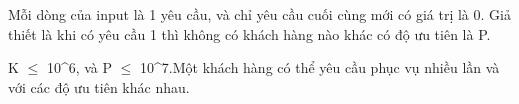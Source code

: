 Mỗi dòng của input là 1 yêu cầu, và chỉ yêu cầu cuối cùng mới có giá trị là 0. Giả thiết là khi có yêu cầu 1 thì không có khách hàng nào khác có độ ưu tiên là P.  

   K $\le$ 10^6, và P $\le$  10^7.Một khách hàng có thể yêu cầu phục vụ nhiều lần và với các độ ưu tiên khác nhau.  



\